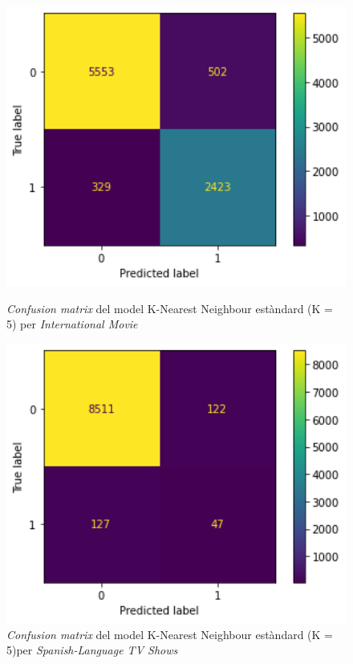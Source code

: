 \documentclass[a4paper, 11pt]{article}
\begin{document}
\begin{figure}[h] %
\begin{minipage}{5cm} %
\begin{center}
    \includegraphics[width=1\textwidth]{ConfMatrix/CM_knn_intenationalmovie.png}
    \caption{\textit{Confusion matrix} del model K-Nearest Neighbour estàndard (K = 5) per \textit{International Movie}}
    \includegraphics[width=1\textwidth]{ConfMatrix/CM_knn_spanish.png}
    \caption{\textit{Confusion matrix} del model K-Nearest Neighbour estàndard (K = 5)per \textit{Spanish-Language TV Shows}}

\end{center}
\end{minipage}
\end{figure}
\end{document}
